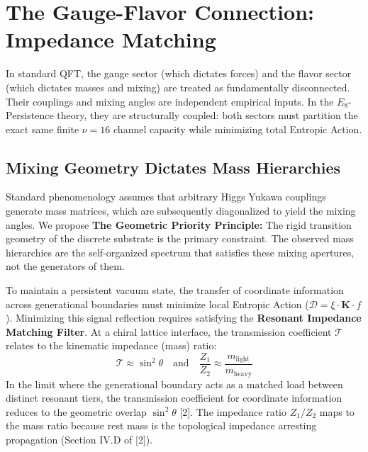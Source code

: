 
\section{The Gauge-Flavor Connection: Impedance Matching}

In standard QFT, the gauge sector (which dictates forces) and the flavor sector (which dictates masses and mixing) are treated as fundamentally disconnected. Their couplings and mixing angles are independent empirical inputs. In the $E_8$-Persistence theory, they are structurally coupled: both sectors must partition the exact same finite $\nu=16$ channel capacity while minimizing total Entropic Action.


\subsection{Mixing Geometry Dictates Mass Hierarchies}

Standard phenomenology assumes that arbitrary Higgs Yukawa couplings generate mass matrices, which are subsequently diagonalized to yield the mixing angles. We propose \textbf{The Geometric Priority Principle:} The rigid transition geometry of the discrete substrate is the primary constraint. The observed mass hierarchies are the self-organized spectrum that satisfies these mixing apertures, not the generators of them.

To maintain a persistent vacuum state, the transfer of coordinate information across generational boundaries must minimize local Entropic Action ($\mathcal{D} = \xi \cdot \mathbf{K} \cdot f$). Minimizing this signal reflection requires satisfying the \textbf{Resonant Impedance Matching Filter}. At a chiral lattice interface, the transmission coefficient $\mathcal{T}$ relates to the kinematic impedance (mass) ratio:
\begin{equation}
    \mathcal{T} \approx \sin^2 \theta \quad \text{and} \quad \frac{Z_1}{Z_2} \approx \frac{m_{\text{light}}}{m_{\text{heavy}}}
\end{equation}
In the limit where the generational boundary acts as a matched load between distinct resonant tiers, the transmission coefficient for coordinate information reduces to the geometric overlap $\sin^2\theta$ [2]. The impedance ratio $Z_1/Z_2$ maps to the mass ratio because rest mass is the topological impedance arresting propagation (Section IV.D of [2]).

